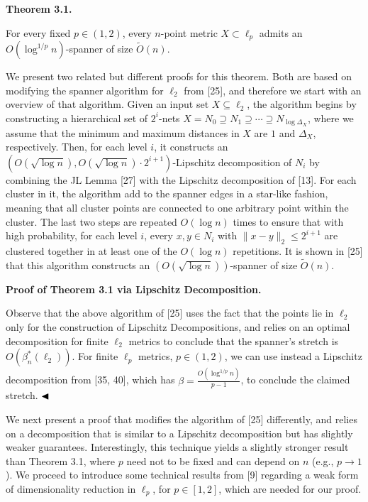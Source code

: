 \documentclass[10pt,a4paper]{amsart}
\begin{document}
\par
\par
\par\medskip\noindent\textbf{Theorem 3.1.}\par
For every fixed $p\in(1,2)$, every $n$-point metric $X\subset\ell_{p}$ admits an $O(\log^{1/p}{n})$-spanner of size $\tilde{O}(n)$.
\par
\par
\par
We present two related but different proofs for this theorem. Both are based on modifying the spanner algorithm for $\ell_{2}$ from [25], and therefore we start with an overview of that algorithm. Given an input set $X\subseteq\ell_{2}$, the algorithm begins by constructing a hierarchical set of $2^{i}$-nets $X=N_{0}\supseteq N_{1}\supseteq\cdots\supseteq N_{\log{\Delta_{X}}}$, where we assume that the minimum and maximum distances in $X$ are $1$ and $\Delta_{X}$, respectively. Then, for each level $i$, it constructs an $(O(\sqrt{\log n}),O(\sqrt{\log n})\cdot 2^{i+1})$-Lipschitz decomposition of $N_{i}$ by combining the JL Lemma [27] with the Lipschitz decomposition of [13]. For each cluster in it, the algorithm add to the spanner edges in a star-like fashion, meaning that all cluster points are connected to one arbitrary point within the cluster. The last two steps are repeated $O(\log n)$ times to ensure that with high probability, for each level $i$, every $x,y\in N_{i}$ with $\|x-y\|_{2}\leq 2^{i+1}$ are clustered together in at least one of the $O(\log n)$ repetitions. It is shown in [25] that this algorithm constructs an $(O(\sqrt{\log{n}}))$-spanner of size $\tilde{O}(n)$.
\par
\par
\par\medskip\noindent\textbf{Proof of Theorem 3.1 via Lipschitz Decomposition.}\par
Observe that the above algorithm of [25] uses the fact that the points lie in $\ell_{2}$ only for the construction of Lipschitz Decompositions, and relies on an optimal decomposition for finite $\ell_{2}$ metrics to conclude that the spanner’s stretch is $O(\beta^{*}_{n}(\ell_{2}))$. For finite $\ell_{p}$ metrics, $p\in(1,2)$, we can use instead a Lipschitz decomposition from [35, 40], which has $\beta=\frac{O(\log^{1/p}{n})}{p-1}$, to conclude the claimed stretch. $\hfill\blacktriangleleft$
\par
\par
We next present a proof that modifies the algorithm of [25] differently, and relies on a decomposition that is similar to a Lipschitz decomposition but has slightly weaker guarantees. Interestingly, this technique yields a slightly stronger result than Theorem 3.1, where $p$ need not to be fixed and can depend on $n$ (e.g., $p\to 1$). We proceed to introduce some technical results from [9] regarding a weak form of dimensionality reduction in $\ell_{p}$, for $p\in[1,2]$, which are needed for our proof.
\end{document}
